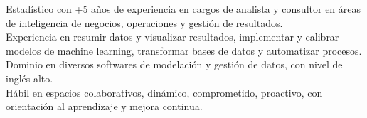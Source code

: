 \documentclass[10pt,a4paper,ragged2e,withhyper,academicons]{altacv}
\begin{document}
\begin{paracol}{2}



\switchcolumn

{\justify Estad\'istico con +5 años de experiencia en cargos de analista y consultor en 
áreas de inteligencia de negocios, operaciones y gestión de resultados.}\\

{\justify Experiencia en resumir datos y visualizar resultados, implementar y calibrar
 modelos de machine learning, transformar bases de datos y automatizar procesos.
 Dominio en diversos softwares de modelación y gestión de datos, con nivel de ingl\'es alto.}\\

{\justify H\'abil en espacios colaborativos, din\'amico, comprometido, proactivo, con orientación al aprendizaje y mejora continua.}\\


\bigskip
\medskip

\medskip
{}
\medskip
{}
\medskip
{}

\bigskip
\medskip





\end{paracol}
\end{document}
